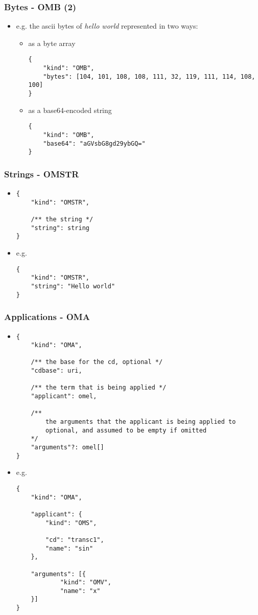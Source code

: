 \documentclass[usenames,dvipsnames]{beamer}
\begin{document}
\begin{frame}[fragile]
    \frametitle{Bytes - OMB (2)}
    \begin{itemize}
    \item e.g. the ascii bytes of \textit{hello world} represented in two ways:
    \begin{itemize}
            \item as a byte array
\begin{lstlisting}
{
    "kind": "OMB",
    "bytes": [104, 101, 108, 108, 111, 32, 119, 111, 114, 108, 100]
}
\end{lstlisting}
            \item as a base64-encoded string
\begin{lstlisting}
{
    "kind": "OMB",
    "base64": "aGVsbG8gd29ybGQ="
}
\end{lstlisting}
        \end{itemize}
    \end{itemize}
\end{frame}

\begin{frame}[fragile]
    \frametitle{Strings - OMSTR}
    \begin{itemize}
        \item
        \begin{lstlisting}
{
    "kind": "OMSTR", 

    /** the string */
    "string": string
}
    \end{lstlisting}
        \item e.g. \begin{lstlisting}
{
    "kind": "OMSTR", 
    "string": "Hello world"
}
\end{lstlisting}
    \end{itemize}
\end{frame}

\begin{frame}[fragile]
    \frametitle{Applications - OMA}
    \begin{itemize}
        \item
        \begin{lstlisting}
{
    "kind": "OMA", 

    /** the base for the cd, optional */
    "cdbase": uri, 

    /** the term that is being applied */
    "applicant": omel, 

    /**
        the arguments that the applicant is being applied to 
        optional, and assumed to be empty if omitted
    */
    "arguments"?: omel[]
}
    \end{lstlisting}
        \item e.g. \begin{lstlisting}
{
    "kind": "OMA",

    "applicant": {
        "kind": "OMS",

        "cd": "transc1",
        "name": "sin"
    },

    "arguments": [{
            "kind": "OMV",
            "name": "x"
    }]
}
\end{lstlisting}
    \end{itemize}
\end{frame}
\end{document}
